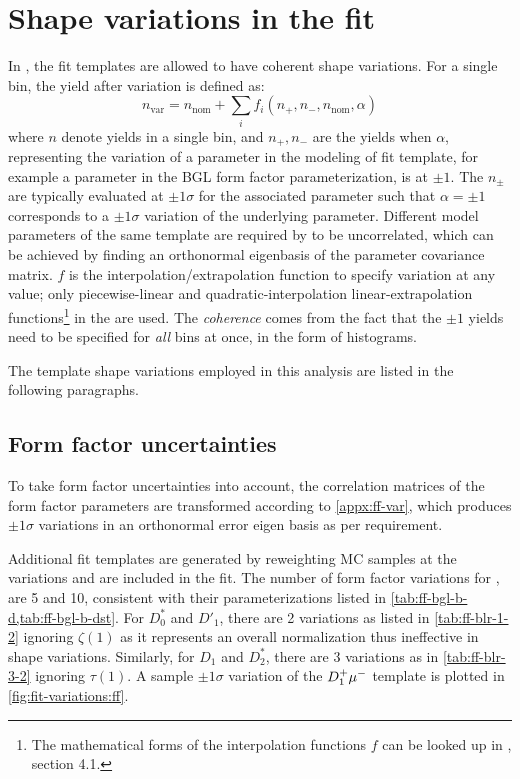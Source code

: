 \section{Shape variations in the fit}
\label{ref:fit:var}

In \HistFactory, the fit templates are allowed to have coherent shape
variations.
For a single bin, the yield after variation is defined as:
\begin{equation}
    n_\text{var} = n_\text{nom} + \sum_i f_i(n_+, n_-, n_\text{nom}, \alpha)
\end{equation}
where $n$ denote yields in a single bin, and
$n_+, n_-$ are the yields when $\alpha$,
representing the variation of a parameter in the modeling of fit template,
for example a parameter in the BGL form factor parameterization,
is at $\pm 1$.
The $n_\pm$ are typically evaluated at $\pm 1 \sigma$ for the associated
parameter such that $\alpha = \pm 1$ corresponds to a $\pm 1 \sigma$ variation
of the underlying parameter.
Different model parameters of the same template are required by \HistFactory to
be uncorrelated,
which can be achieved by finding an orthonormal eigenbasis of the parameter
covariance matrix.
$f$ is the interpolation/extrapolation function to specify variation
at any value;
only piecewise-linear and quadratic-interpolation linear-extrapolation
functions\footnote{
    The mathematical forms of the interpolation functions $f$ can be looked
    up in \cite{Cranmer:2012sba}, section 4.1.
} in the \HistFactory are used.
The \emph{coherence} comes from the fact that the $\pm 1$ yields need to be
specified for \emph{all} bins at once, in the form of histograms.

The template shape variations employed in this analysis are listed in the
following paragraphs.


\subsection{Form factor uncertainties}

To take form factor uncertainties into account, the correlation
matrices of the form factor parameters are transformed
according to \cref{appx:ff-var}, which produces $\pm 1\sigma$ variations
in an orthonormal error eigen basis as per \HistFactory requirement.

Additional fit templates are generated by reweighting MC samples at the
variations and are included in the fit.
The number of form factor variations for \Dz, \Dstar are 5 and 10,
consistent with their parameterizations listed in
\cref{tab:ff-bgl-b-d,tab:ff-bgl-b-dst}.
For $D_0^*$ and $D'_1$, there are 2 variations as listed
in \cref{tab:ff-blr-1-2}
ignoring $\zeta(1)$ as it
represents an overall normalization thus ineffective in shape variations.
Similarly, for $D_1$ and $D_2^*$, there are 3 variations as
in \cref{tab:ff-blr-3-2}
ignoring $\tau(1)$.
A sample $\pm 1\sigma$ variation of the $D_1^+{\mu^-}$ template is plotted in
\cref{fig:fit-variations:ff}.

